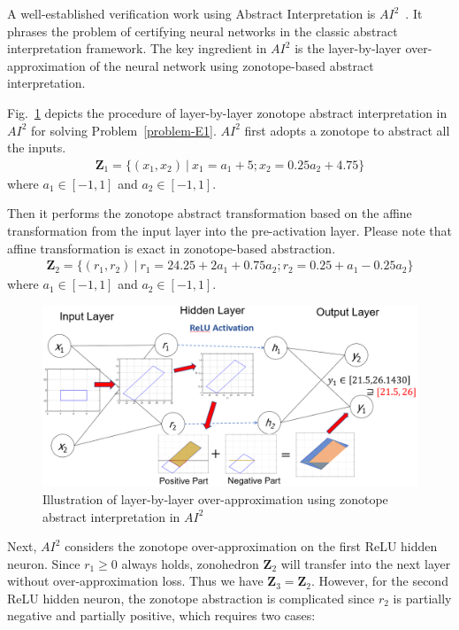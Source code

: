 A well-established verification work using Abstract Interpretation is $AI^2$~\cite{gehr2018ai21}. It phrases the problem of certifying neural networks in the classic abstract interpretation framework. The key ingredient in $AI^2$ is the layer-by-layer over-approximation of the neural network using zonotope-based abstract interpretation. 

Fig.~\ref{fig-E11} depicts the procedure of layer-by-layer zonotope abstract interpretation in $AI^2$ for solving Problem~\ref{problem-E1}. $AI^2$ first adopts a zonotope to abstract all the inputs. 
%
\begin{equation}
    \begin{split}
        \mathbf{Z}_1 = \{(x_1,x_2)~|~x_1 = a_1 +5; x_2= 0.25a_2 +4.75\}
    \end{split}
\end{equation}
%
where $a_1 \in [-1,1]$ and $a_2 \in [-1,1]$.

Then it performs the zonotope abstract transformation based on the affine transformation from the input layer into the pre-activation layer. Please note that affine transformation is exact in zonotope-based abstraction.
%
\begin{equation}
    \begin{split}
        \mathbf{Z}_2 = \{(r_1,r_2)~|~r_1 = 24.25+2a_1+0.75a_2; r_2= 0.25 + a_1 - 0.25a_2\}
    \end{split}
\end{equation}
%
where $a_1 \in [-1,1]$ and $a_2 \in [-1,1]$.


\begin{figure}[t]
	\centering
	\includegraphics[width=1\linewidth]{images/robustnessVerification/Capture8.PNG}
	\caption{Illustration of layer-by-layer over-approximation using zonotope abstract interpretation in $AI^2$}
	\label{fig-E11}
\end{figure}

Next, $AI^2$ considers the zonotope over-approximation on the first ReLU hidden neuron. Since $r_1\geq 0$ always holds, zonohedron $\mathbf{Z}_2$ will transfer into the next layer without over-approximation loss. Thus we have $\mathbf{Z}_3 = \mathbf{Z}_2$. However, for the second ReLU hidden neuron, the zonotope abstraction is complicated since $r_2$ is partially negative and partially positive, which requires two cases:

